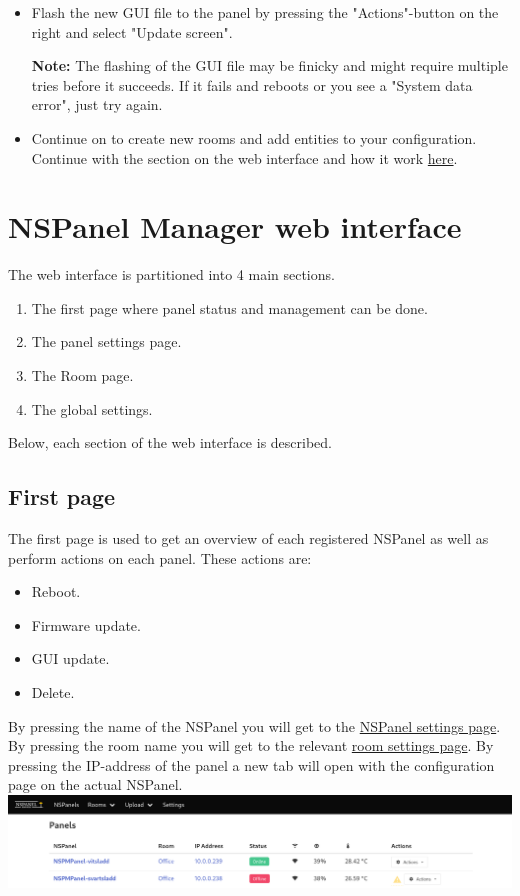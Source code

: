 \documentclass[10pt]{article}
\newcommand{\info}[1]{\begin{infoBox} \textbf{Info:} #1 \end{infoBox}}
\newcommand{\note}[1]{\begin{noteBox} \textbf{Note:} #1 \end{noteBox}}
\begin{document}
\begin{itemize}
      \info{If this is a US NSPanel version then it has to be set in the panel settings. Press the name of the NSPanel in the list and check the "Is US panel"-checkbox.}
      \item Flash the new GUI file to the panel by pressing the "Actions"-button on the right and select "Update screen".
      \note{The flashing of the GUI file may be finicky and might require multiple tries before it succeeds. If it fails and reboots or you see a "System data error", just try again.}
    \item Continue on to create new rooms and add entities to your configuration. Continue with the section on the web interface and how it work \hyperref[sec:nspanelmanager_web_interface]{here}.
    \end{itemize}

    \clearpage
    \section{NSPanel Manager web interface}
    \label{sec:nspanelmanager_web_interface}
    The web interface is partitioned into 4 main sections.
    \begin{enumerate}
      \item The first page where panel status and management can be done.
      \item The panel settings page.
      \item The Room page.
      \item The global settings.
    \end{enumerate}
    Below, each section of the web interface is described.
    \subsection{First page}
    The first page is used to get an overview of each registered NSPanel as well as perform actions on each panel. These actions are:
    \begin{itemize}
      \item Reboot.
      \item Firmware update.
      \item GUI update.
      \item Delete.
    \end{itemize}
    By pressing the name of the NSPanel you will get to the \hyperref[sec:nspanel_page]{NSPanel settings page}. By pressing the room name you will get to the relevant \hyperref[sec:room_page]{room settings page}. By pressing the IP-address of the panel a new tab will open with the configuration page on the actual NSPanel.
    \\
    \includegraphics[width=\textwidth,height=\textheight,keepaspectratio]{index_page.png}
\end{document}

